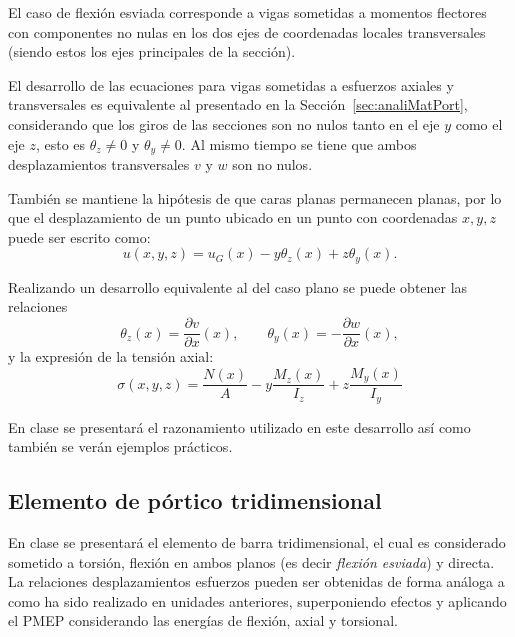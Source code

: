 El caso de flexión esviada corresponde a vigas sometidas a momentos flectores con componentes no nulas en los dos ejes de coordenadas locales transversales (siendo estos los ejes principales de la sección). %

El desarrollo de las ecuaciones para vigas sometidas a esfuerzos axiales y transversales es equivalente al presentado en la Sección~\ref{sec:analiMatPort}, considerando que los giros de las secciones son no nulos tanto en el eje $y$ como el eje $z$, esto es $\theta_z \neq 0$ y $\theta_y \neq 0$. %
%
Al mismo tiempo se tiene que ambos desplazamientos transversales $v$ y $w$ son no nulos.

También se mantiene la hipótesis de que caras planas permanecen planas, por lo que el desplazamiento de un punto ubicado en un punto con coordenadas $x,y,z$ puede ser escrito como:
%
\begin{equation} \label{eqn:despaxidosdir}
	u(x,y,z) = u_G(x) - y \theta_z(x) + z \theta_y(x).
\end{equation}

Realizando un desarrollo equivalente al del caso plano se puede obtener las relaciones 
%
\begin{equation}
	\theta_z(x) = \frac{\partial v}{\partial x}(x), \qquad  \theta_y(x) = - \frac{\partial w}{\partial x}(x),
\end{equation}
%
y la expresión de la tensión axial:
%
\begin{equation}\label{eqn:tensaxiflexesv}
	\boxed{
		\sigma(x,y,z) = \frac{	N (x) }{A}
		- y \frac{	M_z (x) }{I_z} + z \frac{	M_y (x) }{I_y} 
	}
\end{equation}

En clase se presentará el razonamiento utilizado en este desarrollo así como también se verán ejemplos prácticos.




\subsection{Elemento de pórtico tridimensional}

En clase se presentará el elemento de barra tridimensional, el cual es considerado sometido a torsión, flexión en ambos planos (es decir \textit{flexión esviada}) y directa. %
La relaciones desplazamientos esfuerzos pueden ser obtenidas de forma análoga a como ha sido realizado en unidades anteriores, superponiendo efectos y aplicando el PMEP considerando las energías de flexión, axial y torsional.

